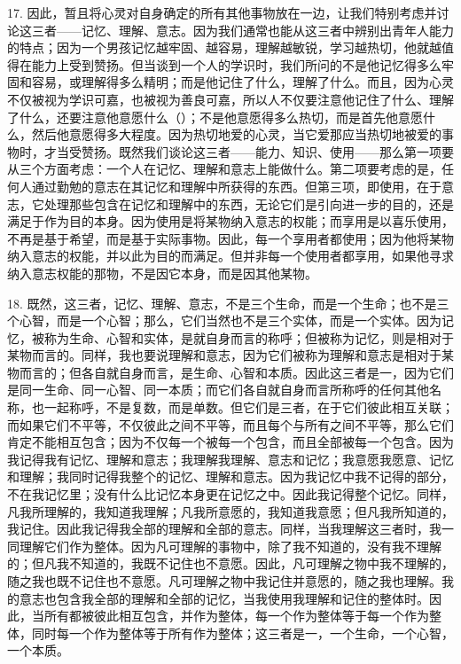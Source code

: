 17. 因此，暂且将心灵对自身确定的所有其他事物放在一边，让我们特别考虑并讨论这三者——记忆、理解、意志。因为我们通常也能从这三者中辨别出青年人能力的特点；因为一个男孩记忆越牢固、越容易，理解越敏锐，学习越热切，他就越值得在能力上受到赞扬。但当谈到一个人的学识时，我们所问的不是他记忆得多么牢固和容易，或理解得多么精明；而是他记住了什么，理解了什么。而且，因为心灵不仅被视为学识可嘉，也被视为善良可嘉，所以人不仅要注意他记住了什么、理解了什么，还要注意他意愿什么（）；不是他意愿得多么热切，而是首先他意愿什么，然后他意愿得多大程度。因为热切地爱的心灵，当它爱那应当热切地被爱的事物时，才当受赞扬。既然我们谈论这三者——能力、知识、使用——那么第一项要从三个方面考虑：一个人在记忆、理解和意志上能做什么。第二项要考虑的是，任何人通过勤勉的意志在其记忆和理解中所获得的东西。但第三项，即使用，在于意志，它处理那些包含在记忆和理解中的东西，无论它们是引向进一步的目的，还是满足于作为目的本身。因为使用是将某物纳入意志的权能；而享用是以喜乐使用，不再是基于希望，而是基于实际事物。因此，每一个享用者都使用；因为他将某物纳入意志的权能，并以此为目的而满足。但并非每一个使用者都享用，如果他寻求纳入意志权能的那物，不是因它本身，而是因其他某物。\par

18. 既然，这三者，记忆、理解、意志，不是三个生命，而是一个生命；也不是三个心智，而是一个心智；那么，它们当然也不是三个实体，而是一个实体。因为记忆，被称为生命、心智和实体，是就自身而言的称呼；但被称为记忆，则是相对于某物而言的。同样，我也要说理解和意志，因为它们被称为理解和意志是相对于某物而言的；但各自就自身而言，是生命、心智和本质。因此这三者是一，因为它们是同一生命、同一心智、同一本质；而它们各自就自身而言所称呼的任何其他名称，也一起称呼，不是复数，而是单数。但它们是三者，在于它们彼此相互关联；而如果它们不平等，不仅彼此之间不平等，而且每个与所有之间不平等，那么它们肯定不能相互包含；因为不仅每一个被每一个包含，而且全部被每一个包含。因为我记得我有记忆、理解和意志；我理解我理解、意志和记忆；我意愿我愿意、记忆和理解；我同时记得我整个的记忆、理解和意志。因为我记忆中我不记得的部分，不在我记忆里；没有什么比记忆本身更在记忆之中。因此我记得整个记忆。同样，凡我所理解的，我知道我理解；凡我所意愿的，我知道我意愿；但凡我所知道的，我记住。因此我记得我全部的理解和全部的意志。同样，当我理解这三者时，我一同理解它们作为整体。因为凡可理解的事物中，除了我不知道的，没有我不理解的；但凡我不知道的，我既不记住也不意愿。因此，凡可理解之物中我不理解的，随之我也既不记住也不意愿。凡可理解之物中我记住并意愿的，随之我也理解。我的意志也包含我全部的理解和全部的记忆，当我使用我理解和记住的整体时。因此，当所有都被彼此相互包含，并作为整体，每一个作为整体等于每一个作为整体，同时每一个作为整体等于所有作为整体；这三者是一，一个生命，一个心智，一个本质。\par

